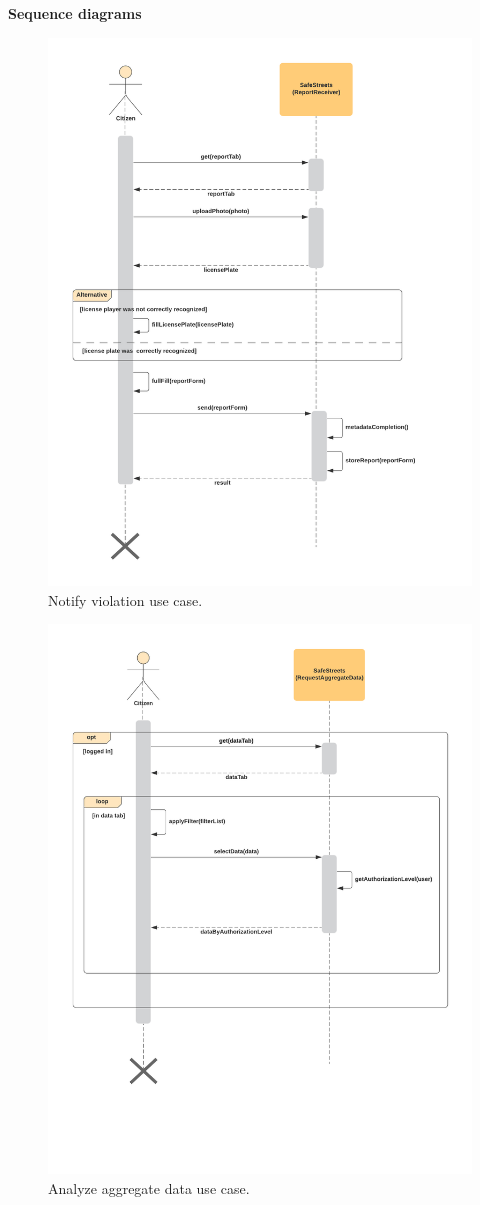 \newpage
\textbf{Sequence diagrams}
\begin{figure}[H]
	\centering
	\includegraphics[width=\linewidth]{Images/UML/NotifyViolationUseCase}
	\caption{Notify violation use case.}
\end{figure}
\begin{figure}[H]
	\centering
	\includegraphics[width=\linewidth]{Images/UML/AnalyzeDataUseCase}
	\caption{Analyze aggregate data use case.}
\end{figure}
